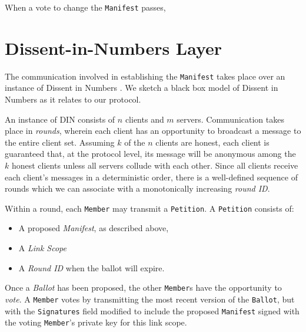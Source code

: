 When a vote to change the \texttt{Manifest} passes, 

\section{Dissent-in-Numbers Layer}
The communication involved in establishing the \texttt{Manifest} takes place
over an instance of Dissent in Numbers \cite{din}. We sketch a
black box model of Dissent in Numbers as it relates to our protocol.

An instance of DIN consists of $n$ clients and $m$ servers. Communication takes
place in \emph{rounds}, wherein each client has an opportunity to broadcast a
message to the entire client set. Assuming $k$ of the $n$ clients are honest,
each client is guaranteed that, at the protocol level, its message will be
anonymous among the $k$ honest clients unless all servers collude with each
other. Since all clients receive each client's
messages in a deterministic order, there is a well-defined sequence of rounds
which we can associate with a monotonically increasing \emph{round ID}.


Within a round, each \texttt{Member} may  transmit a \texttt{Petition}. A
\texttt{Petition} consists of:
\begin{itemize}
  \item A proposed \emph{Manifest}, as described above,
  \item A \emph{Link Scope}
  \item A \emph{Round ID} when the ballot will expire.
\end{itemize}

Once a \emph{Ballot} has been proposed, the other \texttt{Member}s have the
opportunity to \emph{vote}. A \texttt{Member} votes by transmitting the most
recent version of the \texttt{Ballot}, but with the \texttt{Signatures} field
modified to include the proposed \texttt{Manifest} signed with the voting
\texttt{Member}'s private key for this link scope.

